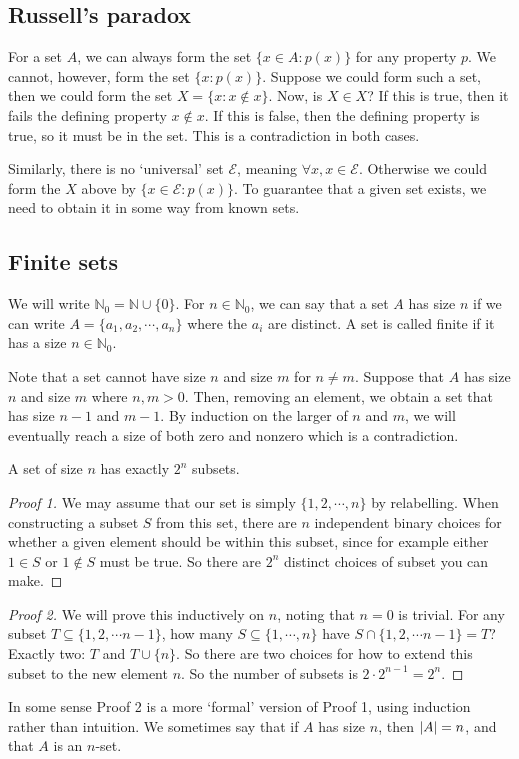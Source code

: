 \subsection{Russell's paradox}
For a set \(A\), we can always form the set \(\{ x \in A: p(x) \}\) for any property \(p\).
We cannot, however, form the set \(\{ x: p(x) \}\).
Suppose we could form such a set, then we could form the set \(X = \{ x: x \notin x \}\).
Now, is \(X \in X\)?
If this is true, then it fails the defining property \(x \notin x\).
If this is false, then the defining property is true, so it must be in the set.
This is a contradiction in both cases.

Similarly, there is no `universal' set \(\mathscr E\), meaning \(\forall x, x \in \mathscr E\).
Otherwise we could form the \(X\) above by \(\{ x \in \mathscr E: p(x) \}\).
To guarantee that a given set exists, we need to obtain it in some way from known sets.

\subsection{Finite sets}
We will write \(\mathbb N_0 = \mathbb N \cup \{ 0 \}\).
For \(n \in \mathbb N_0\), we can say that a set \(A\) has size \(n\) if we can write \(A = \{ a_1, a_2, \cdots, a_n \}\) where the \(a_i\) are distinct.
A set is called finite if it has a size \(n \in \mathbb N_0\).

Note that a set cannot have size \(n\) and size \(m\) for \(n \neq m\).
Suppose that \(A\) has size \(n\) and size \(m\) where \(n, m > 0\).
Then, removing an element, we obtain a set that has size \(n-1\) and \(m-1\).
By induction on the larger of \(n\) and \(m\), we will eventually reach a size of both zero and nonzero which is a contradiction.

\begin{proposition}
	A set of size \(n\) has exactly \(2^n\) subsets.
\end{proposition}
\begin{proof}[Proof 1]
	We may assume that our set is simply \(\{ 1, 2, \cdots, n \}\) by relabelling.
	When constructing a subset \(S\) from this set, there are \(n\) independent binary choices for whether a given element should be within this subset, since for example either \(1 \in S\) or \(1 \notin S\) must be true.
	So there are \(2^n\) distinct choices of subset you can make.
\end{proof}
\begin{proof}[Proof 2]
	We will prove this inductively on \(n\), noting that \(n=0\) is trivial.
	For any subset \(T \subseteq \{ 1, 2, \cdots n-1 \}\), how many \(S \subseteq \{ 1, \cdots, n \}\) have \(S \cap \{ 1, 2, \cdots n-1 \} = T\)?
	Exactly two: \(T\) and \(T \cup \{ n \}\).
	So there are two choices for how to extend this subset to the new element \(n\).
	So the number of subsets is \(2 \cdot 2^{n-1} = 2^n\).
\end{proof}
In some sense Proof 2 is a more `formal' version of Proof 1, using induction rather than intuition.
We sometimes say that if \(A\) has size \(n\), then \(\abs{A} = n\), and that \(A\) is an \(n\)-set.
